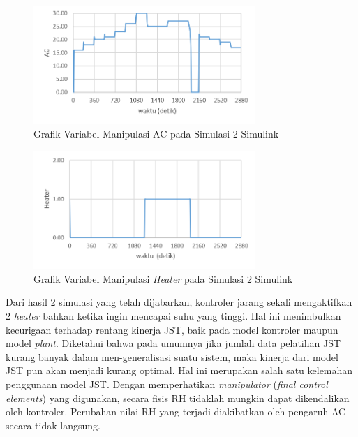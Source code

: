 \begin{figure}[!h]
	\centering
	\includegraphics[width=0.75\textwidth]{figures/Simulink2AC}
	\caption{Grafik Variabel Manipulasi AC pada Simulasi 2 Simulink}
	\label{fig:5:Simulink2AC}
\end{figure}

\begin{figure}[!h]
	\centering
	\includegraphics[width=0.75\textwidth]{figures/Simulink2HT}
	\caption{Grafik Variabel Manipulasi \textit{Heater} pada Simulasi 2 Simulink}
	\label{fig:5:Simulink2HT}
\end{figure}
\vspace{1em}

Dari hasil 2 simulasi yang telah dijabarkan, kontroler jarang sekali mengaktifkan 2 \textit{heater} bahkan ketika ingin mencapai suhu yang tinggi. Hal ini menimbulkan kecurigaan terhadap rentang kinerja JST, baik pada model kontroler maupun model \textit{plant}. Diketahui bahwa pada umumnya jika jumlah data pelatihan JST kurang banyak dalam men-generalisasi suatu sistem, maka kinerja dari model JST pun akan menjadi kurang optimal. Hal ini merupakan salah satu kelemahan penggunaan model JST. Dengan memperhatikan \textit{manipulator} (\textit{final control elements}) yang digunakan, secara fisis RH tidaklah mungkin dapat dikendalikan oleh kontroler. Perubahan nilai RH yang terjadi diakibatkan oleh pengaruh AC secara tidak langsung.